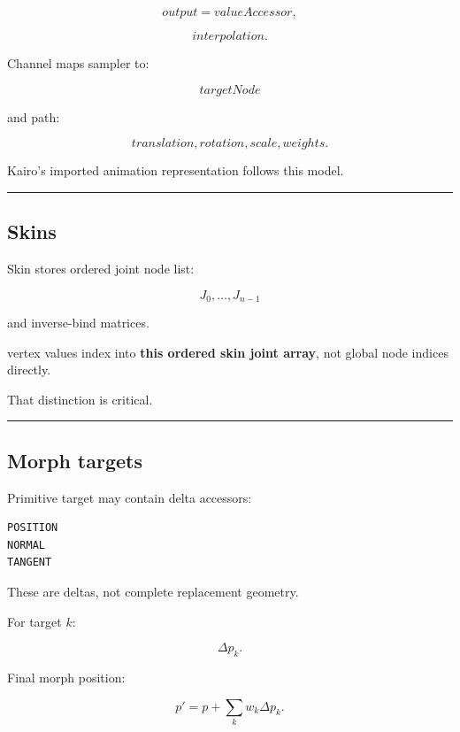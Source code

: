 \[
output=valueAccessor,
\]

\[
interpolation.
\]

Channel maps sampler to:

\[
targetNode
\]

and path:

\[
translation,
rotation,
scale,
weights.
\]

Kairo's imported animation representation follows this model.

\begin{center}\rule{0.5\linewidth}{0.5pt}\end{center}

\subsection{Skins}\label{04-visual-computing-ii-ch041-skins}

\hypertarget{04-visual-computing-ii-ch041-skins}{}

Skin stores ordered joint node list:

\[
J_0,\dots,J_{n-1}
\]

and inverse-bind matrices.

 vertex values index into \textbf{this ordered skin joint array}, not global node indices directly.

That distinction is critical.

\begin{center}\rule{0.5\linewidth}{0.5pt}\end{center}

\subsection{Morph targets}\label{04-visual-computing-ii-ch041-morph-targets}

\hypertarget{04-visual-computing-ii-ch041-morph-targets}{}

Primitive target may contain delta accessors:

\begin{verbatim}
POSITION
NORMAL
TANGENT
\end{verbatim}

These are deltas, not complete replacement geometry.

For target \(k\):

\[
\Delta p_k.
\]

Final morph position:

\[
p'=p+\sum_k w_k\Delta p_k.
\]

